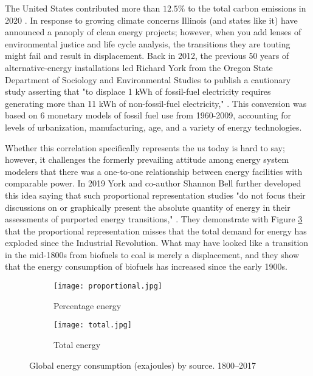 The United States contributed more than $12.5\%$ to the total carbon emissions in 2020 \cite{european_commission_joint_research_centre_ghg_2021}. In response to growing climate concerns Illinois (and states like it) have announced a panoply of clean energy projects; however, when you add lenses of environmental justice and life cycle analysis, the transitions they are touting might fail and result in displacement. Back in 2012, the previous 50 years of alternative-energy installations led Richard York from the Oregon State Department of Sociology and Environmental Studies to publish a cautionary study asserting that "to displace 1 kWh of fossil-fuel electricity requires generating more than 11 kWh of non-fossil-fuel electricity," \cite{york_alternative_2012}. This conversion was based on 6 monetary models of fossil fuel use from 1960-2009, accounting for levels of urbanization, manufacturing, age, and a variety of energy technologies.

Whether this correlation specifically represents the \gls{us} today is hard to say; however, it challenges the formerly prevailing attitude among energy system modelers that there was a one-to-one relationship between energy facilities with comparable power. In 2019 York and co-author Shannon Bell further developed this idea saying that such proportional representation studies "do not focus their discussions on or graphically present the absolute quantity of energy in their assessments of purported energy transitions," \cite{york_energy_2019}. They demonstrate with Figure \ref{fig:both_plots} that the proportional representation misses that the total demand for energy has exploded since the Industrial Revolution. What may have looked like a transition in the mid-1800s from biofuels to coal is merely a displacement, and they show that the energy consumption of biofuels has increased since the early 1900s.

\begin{figure}[ht!]
  \begin{subfigure}{0.494\textwidth}
    \texttt{[image: proportional.jpg]}
    \caption{Percentage energy}
    \label{fig:first_plot}
  \end{subfigure}%
  \begin{subfigure}{0.515\textwidth}
    \texttt{[image: total.jpg]}
    \caption{Total energy}
    \label{fig:second_plot}
  \end{subfigure}
  \caption{Global energy consumption (exajoules) by source. 1800–2017 \cite{york_energy_2019}}
  \label{fig:both_plots}
\end{figure}

